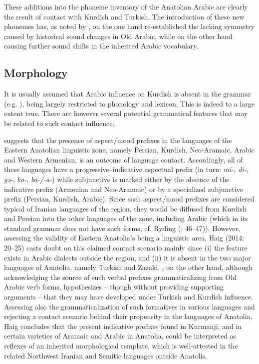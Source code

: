 \documentclass[output=paper]{langsci/langscibook}
\begin{document}
These additions into the phoneme inventory of the Anatolian Arabic are clearly the result of contact with Kurdish and Turkish. The introduction of these new phonemes has, as noted by \citet[84]{Jastrow2011}, on the one hand re-established the lacking symmetry caused by historical sound changes in Old Arabic, while on the other hand causing further sound shifts in the inherited Arabic vocabulary. 

\subsection{Morphology}

It is usually assumed that Arabic influence on Kurdish is absent in the grammar (e.g. \citealt{Edwards1851}), being largely restricted to phonology and lexicon. This is indeed to a large extent true. There are however several potential grammatical features that may be related to such contact influence. 

\citet[75]{Matras2010} suggests that the presence of aspect/mood prefixes in the languages of the Eastern Anatolian linguistic zone, namely Persian, Kurdish, Neo-Aramaic, Arabic and Western Armenian, is an outcome of language contact. Accordingly, all of these languages have a progressive–indicative aspectual prefix (in turn: \textit{mī-,} \textit{di-,} \textit{gǝ-}, \textit{ko-,} \textit{ba-/-a-}) while subjunctive is marked either by the absence of the indicative prefix (Armenian and Neo-Aramaic) or by a specialized subjunctive prefix (Persian, Kurdish, Arabic). Since such aspect/mood prefixes are considered typical of Iranian languages of the region, they would be diffused from Kurdish and Persian into the other languages of the zone, including Arabic (which in its standard grammar does not have such forms, cf. Ryding (\citealt{Ryding2014}: 46–47)). However, assessing the validity of Eastern Anatolia’s being a linguistic area, Haig (2014: 20–25) casts doubt on this claimed contact scenario mainly since (i) the feature exists in Arabic dialects outside the region, and (ii) it is absent in the two major languages of Anatolia, namely Turkish and Zazaki. \citet[92]{Jastrow2011}, on the other hand, although acknowledging the source of such verbal prefixes grammaticalizing from Old Arabic verb forms, hypothesizes – though without providing supporting arguments – that they may have developed under Turkish and Kurdish influence. Assessing also the grammaticalization of such formatives in various languages and rejecting a contact scenario behind their propensity in the languages of Anatolia, Haig \citep[26]{Haig2014} concludes that the present indicative prefixes found in Kurmanji, and in certain varieties of Aramaic and Arabic in Anatolia, could be interpreted as reflexes of an inherited morphological template, which is well-attested in the related Northwest Iranian and Semitic languages outside Anatolia.
\end{document}
